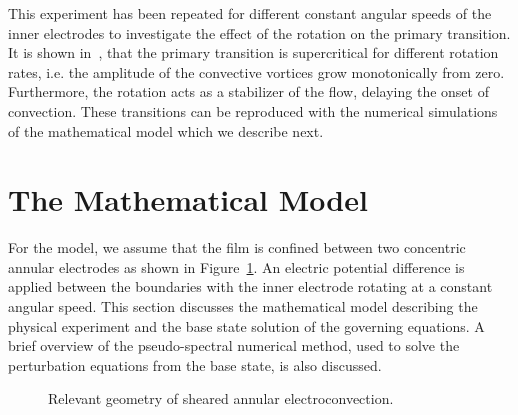 This experiment has been repeated for different constant angular speeds of the inner electrodes to investigate the effect of the rotation on the primary transition. It is shown in~\cite{BAEWIS,AEWSDaDe}, that the primary transition is supercritical for different rotation rates, i.e. the amplitude of the convective vortices grow monotonically from zero. Furthermore, the rotation acts as a stabilizer of the flow, delaying the onset of convection.
These transitions can be reproduced with the numerical simulations of the mathematical model which we describe next.

\section{The Mathematical Model}\label{sec_mat_mod}
For the model, we assume that the film is confined between two concentric annular electrodes as shown in Figure~\ref{experiment_diagram}. An electric potential difference is applied between the boundaries with the inner electrode rotating at a constant angular speed. This section discusses the mathematical model describing the physical experiment and the base state solution of the governing equations. A brief overview of the pseudo-spectral numerical method, used to solve the perturbation equations from the base state, is also discussed.

\begin{figure}[t]
\caption{Relevant geometry of sheared annular electroconvection.}
\label{experiment_diagram}
\end{figure}


